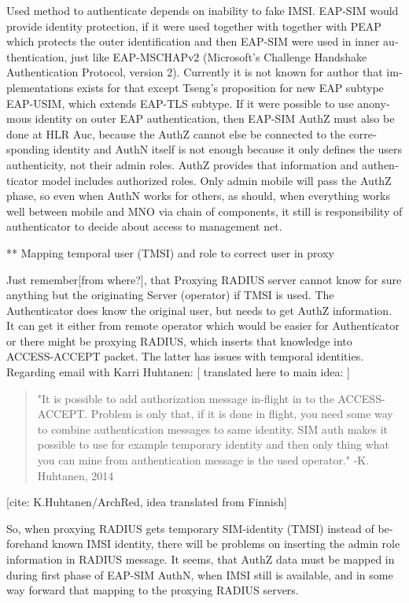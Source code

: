 \documentclass[12pt,a4paper,english]{tutthesis}
\begin{document}
\begin{otherlanguage}{english}
Used method to authenticate depends on inability to fake IMSI.
EAP-SIM would provide identity protection, if it were used together
with together with PEAP which protects the outer identification  and
then EAP-SIM were used in inner authentication, just like EAP-MSCHAPv2
(Microsoft's Challenge Handshake Authentication Protocol, version 2).
Currently it is not known for author that implementations exists for
that except Tseng's proposition\cite{tseng-usim} for  new EAP subtype
EAP-USIM, which extends EAP-TLS subtype.
If it were possible to use anonymous identity on outer EAP
authentication, then EAP-SIM AuthZ must also be done at HLR Auc,
because the AuthZ cannot else be connected to the corresponding
identity and
AuthN itself is not enough because it only defines the users
authenticity, not their admin roles. AuthZ provides that information
and authenticator model includes authorized roles.
Only admin mobile will pass the AuthZ phase, so even when
AuthN  works for others, as should, when everything works well between
mobile and MNO via chain of components, it still is responsibility of
authenticator to decide about access to management net.

** Mapping temporal user (TMSI) and role to correct user in proxy

Just remember[from where?], that Proxying RADIUS server cannot know
for sure anything but the originating Server (operator) if TMSI is
used. The Authenticator does know the original user, but needs to get
AuthZ information. It can get it either from remote operator which
would be easier for Authenticator or there might be proxying RADIUS,
which inserts that knowledge into ACCESS-ACCEPT packet. The latter has
issues with temporal identities.  Regarding email with Karri Huhtanen:
[ translated here to main idea: ]

\begin{quote}
"It is possible to add authorization message in-flight in to the
ACCESS-ACCEPT.
Problem is only that, if it is done in flight, you need some way to
combine authentication messages to same identity. SIM auth makes it
possible to use for example temporary identity and then only thing
what you can mine from authentication message is the used operator."
 -K. Huhtanen, 2014 
\end{quote}
[cite: K.Huhtanen/ArchRed, idea translated from Finnish]




So, when proxying RADIUS gets temporary SIM-identity (TMSI) instead of
beforehand known IMSI identity, there will be problems on inserting
the admin role information in RADIUS message.
It seems, that AuthZ data must be mapped in during first phase of
EAP-SIM AuthN, when IMSI still is available, and in some way forward
that mapping to the proxying RADIUS servers.


\end{otherlanguage}
\end{document}
